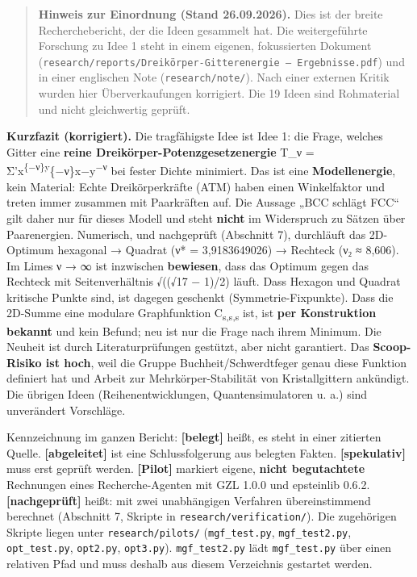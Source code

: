 \begin{quote}
\textbf{Hinweis zur Einordnung (Stand 26.09.2026).} Dies ist der breite Recherchebericht, der die Ideen gesammelt hat. Die weitergeführte Forschung zu Idee 1 steht in einem eigenen, fokussierten Dokument (\texttt{research/reports/Dreikörper-Gitterenergie\ –\ Ergebnisse.pdf}) und in einer englischen Note (\texttt{research/note/}). Nach einer externen Kritik wurden hier Überverkaufungen korrigiert. Die 19 Ideen sind Rohmaterial und nicht gleichwertig geprüft.
\end{quote}

\textbf{Kurzfazit (korrigiert).} Die tragfähigste Idee ist Idee 1: die Frage, welches Gitter eine \textbf{reine Dreikörper-Potenzgesetzenergie} T\_ν = Σ'\textbar x\textbar{}\textsuperscript{\{−ν\}\textbar y\textbar{}}\{−ν\}\textbar x−y\textbar{}\textsuperscript{−ν} bei fester Dichte minimiert. Das ist eine \textbf{Modellenergie}, kein Material: Echte Dreikörperkräfte (ATM) haben einen Winkelfaktor und treten immer zusammen mit Paarkräften auf. Die Aussage „BCC schlägt FCC`` gilt daher nur für dieses Modell und steht \textbf{nicht} im Widerspruch zu Sätzen über Paarenergien. Numerisch, und nachgeprüft (Abschnitt 7), durchläuft das 2D-Optimum hexagonal → Quadrat (ν* = 3,9183649026) → Rechteck (ν₂ ≈ 8,606). Im Limes ν → ∞ ist inzwischen \textbf{bewiesen}, dass das Optimum gegen das Rechteck mit Seitenverhältnis √((√17 − 1)/2) läuft. Dass Hexagon und Quadrat kritische Punkte sind, ist dagegen geschenkt (Symmetrie-Fixpunkte). Dass die 2D-Summe eine modulare Graphfunktion C\textsubscript{s,s,s} ist, ist \textbf{per Konstruktion bekannt} und kein Befund; neu ist nur die Frage nach ihrem Minimum. Die Neuheit ist durch Literaturprüfungen gestützt, aber nicht garantiert. Das \textbf{Scoop-Risiko ist hoch}, weil die Gruppe Buchheit/Schwerdtfeger genau diese Funktion definiert hat und Arbeit zur Mehrkörper-Stabilität von Kristallgittern ankündigt. Die übrigen Ideen (Reihenentwicklungen, Quantensimulatoren u. a.) sind unverändert Vorschläge.

Kennzeichnung im ganzen Bericht: \textbf{{[}belegt{]}} heißt, es steht in einer zitierten Quelle. \textbf{{[}abgeleitet{]}} ist eine Schlussfolgerung aus belegten Fakten. \textbf{{[}spekulativ{]}} muss erst geprüft werden. \textbf{{[}Pilot{]}} markiert eigene, \textbf{nicht begutachtete} Rechnungen eines Recherche-Agenten mit GZL 1.0.0 und epsteinlib 0.6.2. \textbf{{[}nachgeprüft{]}} heißt: mit zwei unabhängigen Verfahren übereinstimmend berechnet (Abschnitt 7, Skripte in \texttt{research/verification/}). Die zugehörigen Skripte liegen unter \texttt{research/pilots/} (\texttt{mgf\_test.py}, \texttt{mgf\_test2.py}, \texttt{opt\_test.py}, \texttt{opt2.py}, \texttt{opt3.py}). \texttt{mgf\_test2.py} lädt \texttt{mgf\_test.py} über einen relativen Pfad und muss deshalb aus diesem Verzeichnis gestartet werden.

